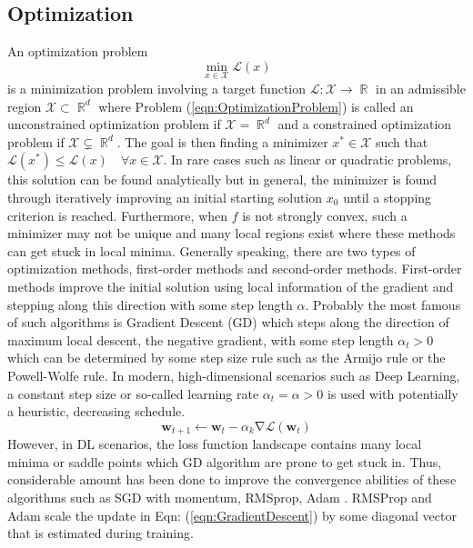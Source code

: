 \documentclass[a4paper, 11pt, oneside]{scrartcl}
\theoremstyle{break}
\DeclareMathOperator{\Real}{\mathbb{R}}
\DeclareMathOperator{\grad}{\nabla}
\newcommand{\matr}[1]{\boldsymbol{#1}}
\newcommand{\set}[1]{\mathcal{#1}}
\numberwithin{equation}{section}
\begin{document}
		\subsection{Optimization} %
			An optimization problem 
			\begin{equation}
				\min_{x \in \set{X}} \mathcal{L} (x)
				\label{eqn:OptimizationProblem}
			\end{equation}
			is a minimization problem involving a target function $\set{L}: \set{X} \to \Real$ in an admissible region $\set{X} \subset \Real^d$ where Problem (\ref{eqn:OptimizationProblem}) is called an unconstrained optimization problem if $\set{X} = \Real^d$ and a constrained optimization problem if $\set{X} \subsetneq \Real^d$.
			The goal is then finding a minimizer $x^{*} \in \set{X}$ such that $\mathcal{L} (x^*) \le \mathcal{L} (x) \quad \forall x \in \set{X}$.
			In rare cases such as linear or quadratic problems, this solution can be found analytically but in general, the minimizer is found through iteratively improving an initial starting solution $x_0$ until a stopping criterion is reached. 
			Furthermore, when $f$ is not strongly convex, such a minimizer may not be unique and many local regions exist where these methods can get stuck in local minima. 
			Generally speaking, there are two types of optimization methods, first-order methods and second-order methods. 
			First-order methods improve the initial solution using local information of the gradient and stepping along this direction with some step length $\alpha$. 
			Probably the most famous of such algorithms is Gradient Descent (GD) which steps along the direction of maximum local descent, the negative gradient, with some step length $\alpha_t > 0$ which can be determined by some step size rule such as the Armijo rule or the Powell-Wolfe rule. 
			In modern, high-dimensional scenarios such as Deep Learning, a constant step size or so-called learning rate $\alpha_t = \alpha > 0$ is used with potentially a heuristic, decreasing schedule.
			\begin{equation}
				\matr{w}_{t+1} \leftarrow \matr{w}_t - \alpha_k \grad \mathcal{L} (\matr{w}_t)
				\label{eqn:GradientDescent}
			\end{equation}
			However, in DL scenarios, the loss function landscape contains many local minima or saddle points which GD algorithm are prone to get stuck in. 
			Thus, considerable amount has been done to improve the convergence abilities of these algorithms such as SGD with momentum, RMSprop, Adam \parencite{KB14, R16}. 
			RMSProp and Adam scale the update in Eqn: (\ref{eqn:GradientDescent}) by some diagonal vector that is estimated during training.
\end{document}
